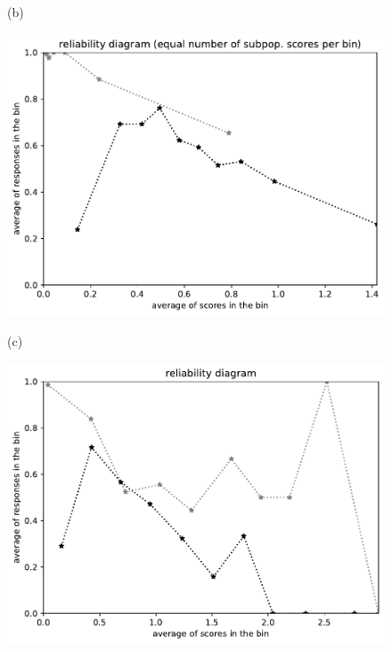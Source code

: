 \documentclass{article}
\newlength{\vertsep}
\newlength{\imsize}
\begin{document}
\begin{figure}
\begin{centering}
(b)
\parbox{\imsize}{\includegraphics[width=\imsize]
{../codes/unweighted/nll-1-248-Eskimo-dog-husky_293-cheetah-chetah-Acinonyx-jubatusequisamps10.pdf}}
\quad\quad
(c)
\parbox{\imsize}{\includegraphics[width=\imsize]
{../codes/unweighted/nll-1-248-Eskimo-dog-husky_293-cheetah-chetah-Acinonyx-jubatusequiscore10.pdf}}

\vspace{\vertsep}


\end{centering}
\end{figure}
\end{document}

